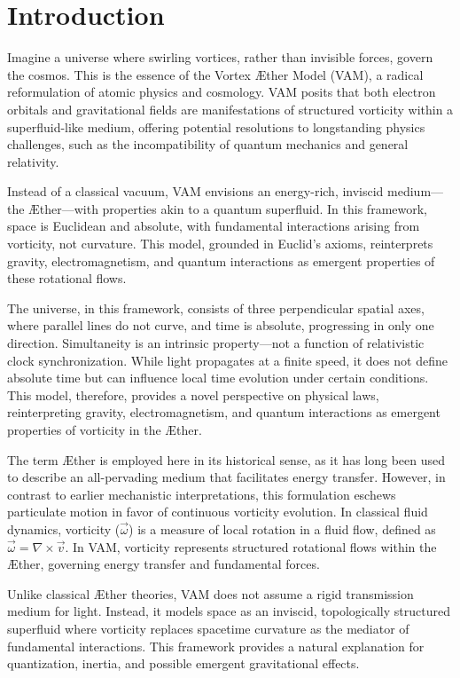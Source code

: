 

\section*{Introduction}
Imagine a universe where swirling vortices, rather than invisible forces, govern the cosmos. This is the essence of the Vortex Æther Model (VAM), a radical reformulation of atomic physics and cosmology. VAM posits that both electron orbitals and gravitational fields are manifestations of structured vorticity within a superfluid-like medium, offering potential resolutions to longstanding physics challenges, such as the incompatibility of quantum mechanics and general relativity.

Instead of a classical vacuum, VAM envisions an energy-rich, inviscid medium—the Æther—with properties akin to a quantum superfluid. In this framework, space is Euclidean and absolute, with fundamental interactions arising from vorticity, not curvature. This model, grounded in Euclid's axioms, reinterprets gravity, electromagnetism, and quantum interactions as emergent properties of these rotational flows.


The universe, in this framework, consists of three perpendicular spatial axes, where parallel lines do not curve, and time is absolute, progressing in only one direction. Simultaneity is an intrinsic property—not a function of relativistic clock synchronization. While light propagates at a finite speed, it does not define absolute time but can influence local time evolution under certain conditions. This model, therefore, provides a novel perspective on physical laws, reinterpreting gravity, electromagnetism, and quantum interactions as emergent properties of vorticity in the Æther.


The term Æther is employed here in its historical sense, as it has long been used to describe an all-pervading medium that facilitates energy transfer.
However, in contrast to earlier mechanistic interpretations, this formulation eschews particulate motion in favor of continuous vorticity evolution. In classical fluid dynamics, vorticity ($\vec{\omega}$) is a measure of local rotation in a fluid flow, defined as $\vec{\omega} = \nabla \times \vec{v}$. In VAM, vorticity represents structured rotational flows within the Æther, governing energy transfer and fundamental forces.

Unlike classical Æther theories, VAM does not assume a rigid transmission medium for light. Instead, it models space as an inviscid, topologically structured superfluid where vorticity replaces spacetime curvature as the mediator of fundamental interactions. This framework provides a natural explanation for quantization, inertia, and possible emergent gravitational effects.

